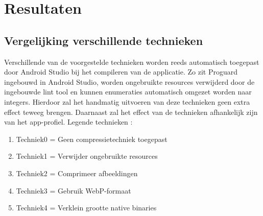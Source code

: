 
\chapter{Resultaten}
\label{ch:resultaten}

\section{Vergelijking verschillende technieken}
\label{sec:technieken}

Verschillende van de voorgestelde technieken worden reeds automatisch toegepast door Android Studio bij het compileren van de applicatie. Zo zit Proguard ingebouwd in Android Studio, worden ongebruikte resources verwijderd door de ingebouwde lint tool en kunnen enumeraties automatisch omgezet worden naar integers. Hierdoor zal het handmatig uitvoeren van deze technieken geen extra effect teweeg brengen. Daarnaast zal het effect van de technieken afhankelijk zijn van het app-profiel. 
Legende technieken : 
\begin{enumerate}
	\item Techniek0 = Geen compressietechniek toegepast
	\item Techniek1 = Verwijder ongebruikte resources
	\item Techniek2 = Comprimeer afbeeldingen
	\item Techniek3 = Gebruik WebP-formaat
	\item Techniek4 = Verklein grootte native binaries
\end{enumerate}
